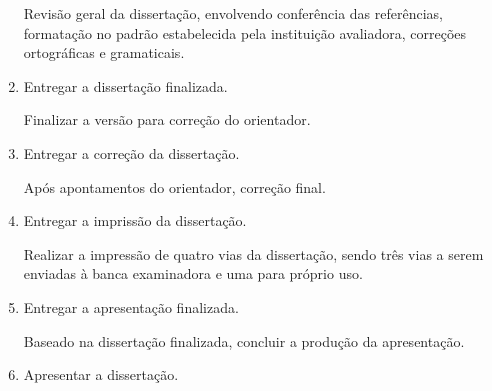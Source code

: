 \begin{enumerate}
Revisão geral da dissertação, envolvendo conferência das referências, formatação no padrão estabelecida pela instituição avaliadora, correções ortográficas e gramaticais.

  \item \label{finalizar}   Entregar a dissertação finalizada.

Finalizar a versão para correção do orientador.

  \item \label{corrigir}    Entregar a correção da dissertação.

Após apontamentos do orientador, correção final.

  \item \label{imprimir}    Entregar a imprissão da dissertação.

Realizar a impressão de quatro vias da dissertação, sendo três vias a serem  enviadas à banca examinadora e uma para próprio uso.

  \item \label{finalApres}  Entregar a apresentação finalizada.

Baseado na dissertação finalizada, concluir a produção da apresentação.

  \item \label{apresentar}  Apresentar a dissertação.

\end{enumerate}


